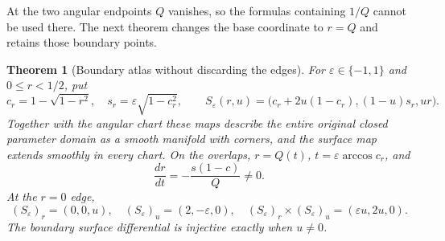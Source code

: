 \documentclass[11pt,a4paper]{article}
\newtheorem{theorem}{Theorem}[section]
\theoremstyle{definition}\newtheorem{definition}[theorem]{Definition}
\theoremstyle{remark}\newtheorem{remark}[theorem]{Remark}
\begin{document}
At the two angular endpoints $Q$ vanishes, so the formulas containing
$1/Q$ cannot be used there. The next theorem changes the base coordinate
to $r=Q$ and retains those boundary points.


\begin{theorem}[Boundary atlas without discarding the edges]\label{thm:atlas}
For $\varepsilon\in\{-1,1\}$ and $0\leq r<1/2$, put
\[
 c_r=1-\sqrt{1-r^2},\quad s_r=\varepsilon\sqrt{1-c_r^2},\qquad
 S_\varepsilon(r,u)=\big(c_r+2u(1-c_r),(1-u)s_r,ur\big).
\]
Together with the angular chart these maps describe the entire original
closed parameter domain as a smooth manifold with corners, and the surface
map extends smoothly in every chart. On the overlaps,
$r=Q(t)$, $t=\varepsilon\arccos c_r$, and
\begin{equation}\label{eq:transition}
 \frac{dr}{dt}=-\frac{s(1-c)}{Q}\ne0.
\end{equation}
At the $r=0$ edge,
\begin{equation}\label{eq:boundary-derivative}
 (S_\varepsilon)_r=(0,0,u),\quad
 (S_\varepsilon)_u=(2,-\varepsilon,0),\quad
 (S_\varepsilon)_r\times(S_\varepsilon)_u=(\varepsilon u,2u,0).
\end{equation}
The boundary surface differential is injective exactly when $u\ne0$.
\end{theorem}
\end{document}
